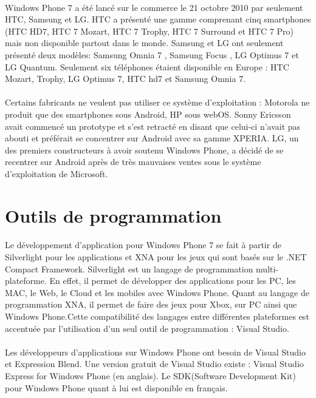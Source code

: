\documentclass[twoside,UTF8]{EPURapport}
\begin{document}
\paragraph{}
Windows Phone 7 a été lancé sur le commerce le 21 octobre 2010 par seulement HTC, Samsung et LG. HTC a présenté une gamme comprenant cinq smartphones (HTC HD7, HTC 7 Mozart, HTC 7 Trophy, HTC 7 Surround et HTC 7 Pro) mais non disponible partout dans le monde. Samsung et LG ont seulement présenté deux modèles: Samsung Omnia 7 , Samsung Focus , LG Optimus 7 et LG Quantum. Seulement six téléphones étaient disponible en Europe : HTC Mozart, Trophy, LG Optimus 7, HTC hd7 et Samsung Omnia 7.

\paragraph{}
Certains fabricants ne veulent pas utiliser ce système d'exploitation : Motorola ne produit que des smartphones sous Android, HP sous webOS. Sonny Ericsson avait commencé un prototype et s'est retracté en disant que celui-ci n'avait pas abouti et préférait se concentrer sur Android avec sa gamme XPERIA. LG, un des premiers constructeurs à avoir soutenu Windows Phone, a décidé de se recentrer sur Android après de très mauvaises ventes sous le système d'exploitation de Microsoft.

	
\section{Outils de programmation}

\paragraph{}
Le développement d'application pour Windows Phone 7 se fait à partir de Silverlight pour les applications et XNA pour les jeux qui sont basés sur le .NET Compact Framework. Silverlight est un langage de programmation multi-plateforme. En effet, il permet de développer des applications pour les PC, les MAC, le Web, le Cloud et les mobiles avec Windows Phone. Quant au langage de programmation XNA, il permet de faire des jeux pour Xbox, sur PC ainsi que Windows Phone.Cette compatibilité des langages entre différentes plateformes est accentuée par l'utilisation d'un seul outil de programmation : Visual Studio. 

\paragraph{}
Les développeurs d'applications sur Windows Phone ont besoin de Visual Studio et Expression Blend. Une version gratuit de Visual Studio existe : Visual Studio Express for Windows Phone (en anglais). Le SDK(Software Development Kit) pour Windows Phone quant à lui est disponible en français. 
\end{document}

